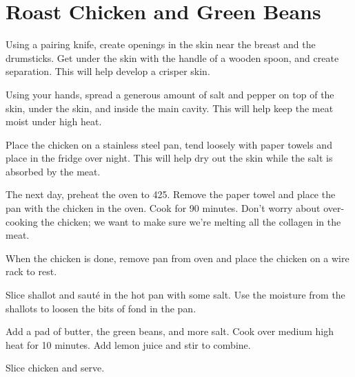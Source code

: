 

\section{Roast Chicken and Green Beans}
\begin{recipe}



Using a pairing knife, create openings in the skin near the breast and the drumsticks. Get under the skin with the handle of a wooden spoon, and create separation. This will help develop a crisper skin.

Using your hands, spread a generous amount of salt and pepper on top of the skin, under the skin, and inside the main cavity. This will help keep the meat moist under high heat.

Place the chicken on a stainless steel pan, tend loosely with paper towels and place in the fridge over night. This will help dry out the skin while the salt is absorbed by the meat.

The next day, preheat the oven to 425. Remove the paper towel and place the pan with the chicken in the oven. Cook for 90 minutes. Don't worry about over-cooking the chicken; we want to make sure we're melting all the collagen in the meat.


When the chicken is done, remove pan from oven and place the chicken on a wire rack to rest.

Slice shallot and sauté in the hot pan with some salt. Use the moisture from the shallots to loosen the bits of fond in the pan.

Add a pad of butter, the green beans, and more salt. Cook over medium high heat for 10 minutes. Add lemon juice and stir to combine.

Slice chicken and serve.

\end{recipe}
